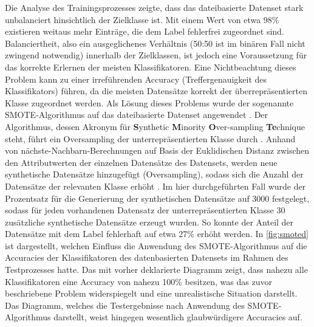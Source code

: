 Die Analyse des Trainingsprozesses zeigte, dass das dateibasierte Datenset stark unbalanciert hinsichtlich der Zielklasse ist. Mit einem Wert von etwa 98\% existieren weitaus mehr Einträge, die dem Label \glqq fehlerfrei\grqq{} zugeordnet sind. Balanciertheit, also ein ausgeglichenes Verhältnis (50:50 ist im binären Fall nicht zwingend notwendig) innerhalb der Zielklassen, ist jedoch eine Voraussetzung für das korrekte Erlernen der meisten Klassifikatoren. Eine Nichtbeachtung dieses Problem kann zu einer irreführenden Accuracy (Treffergenauigkeit des Klassifikators) führen, da die meisten Datensätze korrekt der überrepräsentierten Klasse zugeordnet werden. Als Lösung dieses Problems wurde der sogenannte SMOTE-Algorithmus auf das dateibasierte Datenset angewendet \cite{Chawla2002}. Der Algorithmus, dessen Akronym für \textbf{S}ynthetic \textbf{M}inority \textbf{O}ver-sampling \textbf{Te}chnique steht, führt ein Oversampling der unterrepräsentierten Klasse durch \cite{Chawla2002}. Anhand von nächste-Nachbarn-Berechnungen auf Basis der Euklidischen Distanz zwischen den Attributwerten der einzelnen Datensätze des Datensets, werden neue synthetische Datensätze hinzugefügt (Oversampling), sodass sich die Anzahl der Datensätze der relevanten Klasse erhöht \cite{Chawla2002}. Im hier durchgeführten Fall wurde der Prozentsatz für die Generierung der synthetischen Datensätze auf 3000 festgelegt, sodass für jeden vorhandenen Datensatz der unterrepräsentierten Klasse 30 zusätzliche synthetische Datensätze erzeugt wurden. So konnte der Anteil der Datensätze mit dem Label \glqq fehlerhaft\grqq{} auf etwa 27\% erhöht werden. In \autoref{fig:smoted} ist dargestellt, welchen Einfluss die Anwendung des SMOTE-Algorithmus auf die Accuracies der Klassifikatoren des datenbasierten Datensets im Rahmen des Testprozesses hatte. Das mit \glqq vorher\grqq{} deklarierte Diagramm zeigt, dass nahezu alle Klassifikatoren eine Accuracy von nahezu 100\% besitzen, was das zuvor beschriebene Problem widerspiegelt und eine unrealistische Situation darstellt. Das Diagramm, welches die Testergebnisse nach Anwendung des SMOTE-Algorithmus darstellt, weist hingegen wesentlich glaubwürdigere Accuracies auf.



